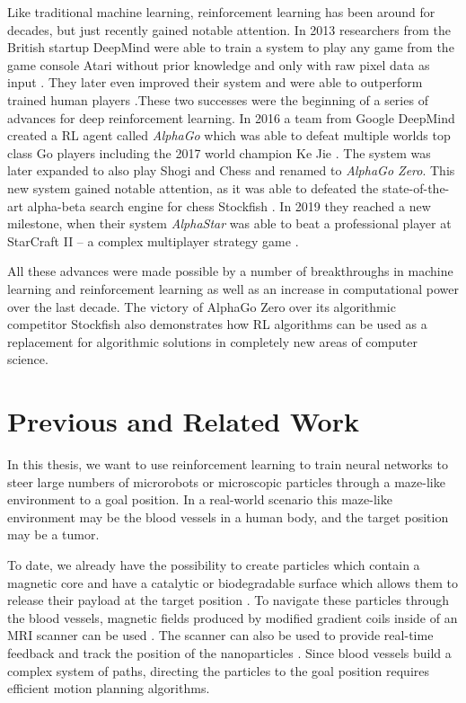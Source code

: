  Like traditional machine learning, reinforcement learning has been around for decades, but just recently gained notable attention. In 2013 researchers from the British startup DeepMind were able to train a system to play any game from the game console Atari without prior knowledge and only with raw pixel data as input \cite{mnih2013playing}. They later even improved their system and were able to outperform trained human players \cite{mnih2015human}.These two successes were the beginning of a series of advances for deep reinforcement learning. In 2016 a team from Google DeepMind created a RL agent called \textit{AlphaGo} which was able to defeat multiple worlds top class Go players including the 2017 world champion Ke Jie \cite{borowiec2016alphago}. The system was later expanded to also play Shogi and Chess and renamed to \textit{AlphaGo Zero}. This new system gained notable attention, as it was able to defeated the state-of-the-art alpha-beta search engine for chess Stockfish \cite{silver2017mastering}. In 2019 they reached a new milestone, when their system \textit{AlphaStar} was able to beat a professional player at StarCraft II -- a complex multiplayer strategy game \cite{arulkumaran2019alphastar}. 

 All these advances were made possible by a number of breakthroughs in machine learning and reinforcement learning as well as an increase in computational power over the last decade. The victory of AlphaGo Zero over its algorithmic competitor Stockfish also demonstrates how RL algorithms can be used as a replacement for algorithmic solutions in completely new areas of computer science. 


\section{Previous and Related Work} \label{sec:RelatedWork}
In this thesis, we want to use reinforcement learning to train neural networks to steer large numbers of microrobots or microscopic particles through a maze-like environment to a goal position. In a real-world scenario this maze-like environment may be the blood vessels in a human body, and the target position may be a tumor. 

To date, we already have the possibility to create particles which contain a magnetic core and have a catalytic or biodegradable surface which allows them to release their payload at the target position \cite{litvinov2012high, mellal2015magnetic}. To navigate these particles through the blood vessels, magnetic fields produced by modified gradient coils inside of an MRI scanner can be used \cite{mathieu2007magnetic, mathieu2010steering}. The scanner can also be used to provide real-time feedback and track the position of the nanoparticles \cite{pouponneau2009magnetic}. Since blood vessels build a complex system of paths, directing the particles to the goal position requires efficient motion planning algorithms. 


